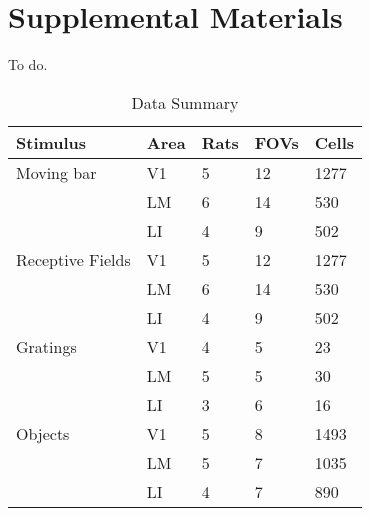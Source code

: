 \chapter{Supplemental Materials}
\label{supplementals}

To do.



\begin{table}[h]
 \caption{Data Summary}
  \centering
   \begin{tabular}{lllll}
    \toprule
    Stimulus & Area & Rats & FOVs & Cells   \\
    \midrule
    Moving bar & V1  & 5 & 12 & 1277        \\
               & LM  & 6 & 14 & 530         \\
               & LI  & 4 & 9 & 502          \\
    \midrule
    Receptive Fields & V1  & 5 & 12 & 1277  \\
                     & LM  & 6 & 14 & 530   \\
                     & LI  & 4 & 9 & 502    \\
    \midrule
    Gratings & V1  & 4 & 5 & 23     \\
             & LM  & 5 & 5 & 30     \\
             & LI  & 3 & 6 & 16     \\
    \midrule
    Objects  & V1  & 5 & 8 & 1493   \\
             & LM  & 5 & 7 & 1035   \\
             & LI  & 4 & 7 & 890    \\
    \bottomrule
  \end{tabular}
  \label{tab:data_counts}
\end{table}




